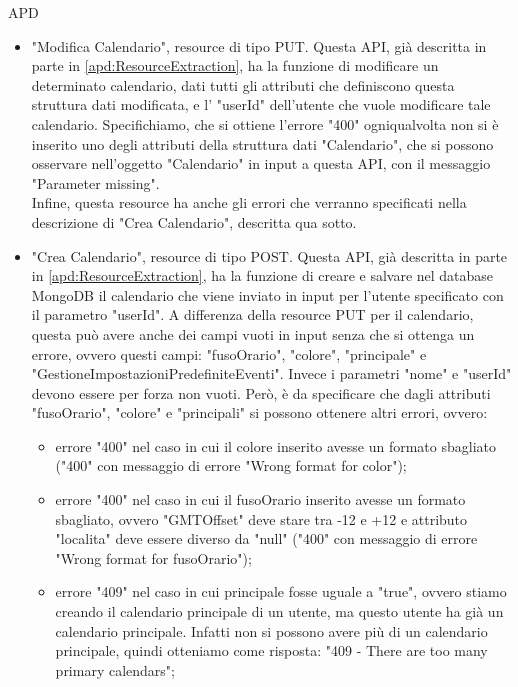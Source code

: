 \begin{listaPersonale} {APD}
\begin{listaPersonale2}[APD]{}
\begin{listaPersonale3}[APD]{}
\begin{itemize}
                \item "Modifica Calendario", resource di tipo PUT. Questa API, già descritta in parte in \ref{apd:ResourceExtraction}, ha la funzione di modificare un determinato calendario, dati tutti gli attributi che definiscono questa struttura dati modificata, e l' "userId" dell'utente che vuole modificare tale calendario. Specifichiamo, che si ottiene l'errore "400" ogniqualvolta non si è inserito uno degli attributi della struttura dati "Calendario", che si possono osservare nell'oggetto "Calendario" in input a questa API, con il messaggio "Parameter missing". \\
                      Infine, questa resource ha anche gli errori che verranno specificati nella descrizione di "Crea Calendario", descritta qua sotto.
                \item "Crea Calendario", resource di tipo POST. Questa API, già descritta in parte in \ref{apd:ResourceExtraction}, ha la funzione di creare e salvare nel database MongoDB il calendario che viene inviato in input per l'utente specificato con il parametro "userId". A differenza della resource PUT per il calendario, questa può avere anche dei campi vuoti in input senza che si ottenga un errore, ovvero questi campi: "fusoOrario", "colore", "principale" e "GestioneImpostazioniPredefiniteEventi". Invece i parametri "nome" e "userId" devono essere per forza non vuoti. Però, è da specificare che dagli attributi "fusoOrario", "colore" e "principali" si possono ottenere altri errori, ovvero:
                      \begin{itemize}
                          \item errore "400" nel caso in cui il colore inserito avesse un formato sbagliato ("400" con messaggio di errore "Wrong format for color");
                          \item errore "400" nel caso in cui il fusoOrario inserito avesse un formato sbagliato, ovvero "GMTOffset" deve stare tra -12 e +12 e attributo "localita" deve essere diverso da "null" ("400" con messaggio di errore "Wrong format for fusoOrario");
                          \item errore "409" nel caso in cui principale fosse uguale a "true", ovvero stiamo creando il calendario principale di un utente, ma questo utente ha già un calendario principale. Infatti non si possono avere più di un calendario principale, quindi otteniamo come risposta: "409 - There are too many primary calendars";
                      \end{itemize}

\end{itemize}
\end{listaPersonale3}
\end{listaPersonale2}
\end{listaPersonale}
